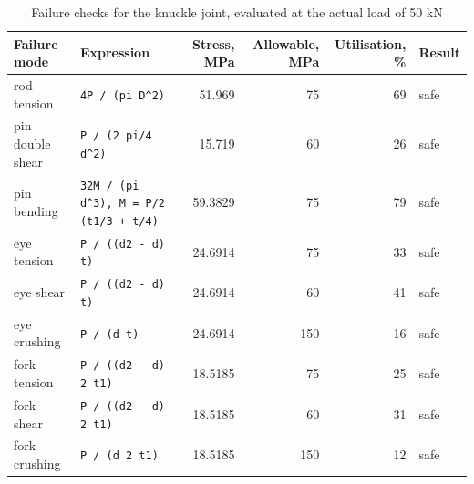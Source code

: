 \begin{table}[htbp]
\centering\footnotesize
\caption{Failure checks for the knuckle joint, evaluated at the actual load of 50 kN}\label{tab:checks}
\begin{tabularx}{\textwidth}{>{\raggedright\arraybackslash}p{2.4cm}>{\raggedright\arraybackslash}Xrrr>{\raggedright\arraybackslash}p{1.2cm}}
\toprule
Failure mode & Expression & Stress, MPa & Allowable, MPa & Utilisation, \% & Result \\
\midrule
rod tension & \texttt{4P / (pi D\^{}2)} & 51.969 & 75 & 69 & safe \\
pin double shear & \texttt{P / (2 pi/4 d\^{}2)} & 15.719 & 60 & 26 & safe \\
pin bending & \texttt{32M / (pi d\^{}3), M = P/2 (t1/3 + t/4)} & 59.3829 & 75 & 79 & safe \\
eye tension & \texttt{P / ((d2 - d) t)} & 24.6914 & 75 & 33 & safe \\
eye shear & \texttt{P / ((d2 - d) t)} & 24.6914 & 60 & 41 & safe \\
eye crushing & \texttt{P / (d t)} & 24.6914 & 150 & 16 & safe \\
fork tension & \texttt{P / ((d2 - d) 2 t1)} & 18.5185 & 75 & 25 & safe \\
fork shear & \texttt{P / ((d2 - d) 2 t1)} & 18.5185 & 60 & 31 & safe \\
fork crushing & \texttt{P / (d 2 t1)} & 18.5185 & 150 & 12 & safe \\
\bottomrule
\end{tabularx}
\end{table}
